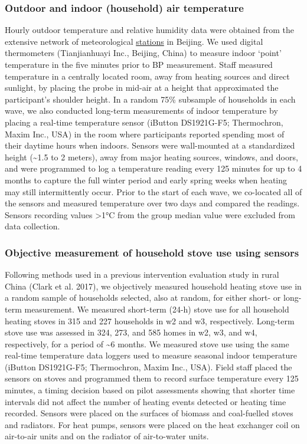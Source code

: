 \documentclass[
  letterpaper,
  DIV=11,
  numbers=noendperiod]{scrartcl}
\begin{document}
\subsubsection{Outdoor and indoor (household) air
temperature}\label{outdoor-and-indoor-household-air-temperature}

Hourly outdoor temperature and relative humidity data were obtained from
the extensive network of meteorological
\href{http://beijingair.sinaapp.com}{stations} in Beijing. We used
digital thermometers (Tianjianhuayi Inc., Beijing, China) to measure
indoor `point' temperature in the five minutes prior to BP measurement.
Staff measured temperature in a centrally located room, away from
heating sources and direct sunlight, by placing the probe in mid-air at
a height that approximated the participant's shoulder height. In a
random 75\% subsample of households in each wave, we also conducted
long-term measurements of indoor temperature by placing a real-time
temperature sensor (iButton DS1921G-F5; Thermochron, Maxim Inc., USA) in
the room where participants reported spending most of their daytime
hours when indoors. Sensors were wall-mounted at a standardized height
(\textasciitilde1.5 to 2 meters), away from major heating sources,
windows, and doors, and were programmed to log a temperature reading
every 125 minutes for up to 4 months to capture the full winter period
and early spring weeks when heating may still intermittently occur.
Prior to the start of each wave, we co-located all of the sensors and
measured temperature over two days and compared the readings. Sensors
recording values \textgreater1°C from the group median value were
excluded from data collection.

\subsubsection{Objective measurement of household stove use using
sensors}\label{objective-measurement-of-household-stove-use-using-sensors}

Following methods used in a previous intervention evaluation study in
rural China (Clark et al. 2017), we objectively measured household
heating stove use in a random sample of households selected, also at
random, for either short- or long-term measurement. We measured
short-term (24-h) stove use for all household heating stoves in 315 and
227 households in w2 and w3, respectively. Long-term stove use was
assessed in 324, 273, and 585 homes in w2, w3, and w4, respectively, for
a period of \textasciitilde6 months. We measured stove use using the
same real-time temperature data loggers used to measure seasonal indoor
temperature (iButton DS1921G-F5; Thermochron, Maxim Inc., USA). Field
staff placed the sensors on stoves and programmed them to record surface
temperature every 125 minutes, a timing decision based on pilot
assessments showing that shorter time intervals did not affect the
number of heating events detected or heating time recorded. Sensors were
placed on the surfaces of biomass and coal-fuelled stoves and radiators.
For heat pumps, sensors were placed on the heat exchanger coil on
air-to-air units and on the radiator of air-to-water units.
\end{document}
